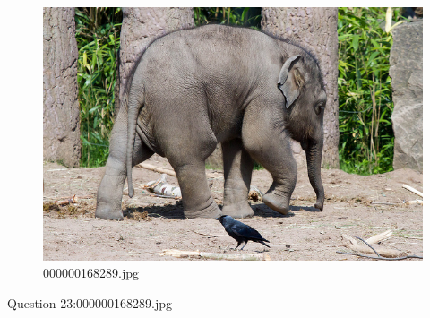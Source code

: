     \begin{figure}[h]
        \centering
        \includegraphics[width=0.8\linewidth]{../image set/easy/000000168289.jpg}
        \caption{000000168289.jpg}
    \end{figure}
    Question 23:000000168289.jpg
